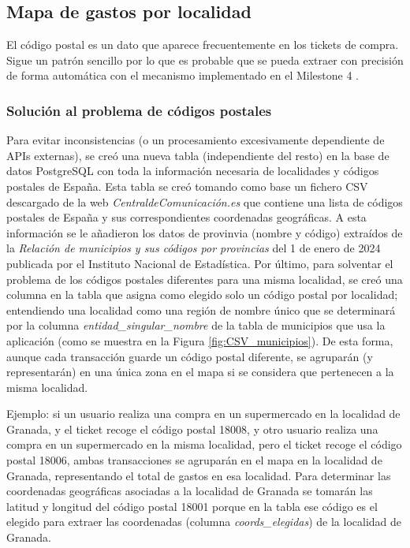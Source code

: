 \subsection{Mapa de gastos por localidad}
El código postal es un dato que aparece frecuentemente en los tickets de compra. Sigue un patrón sencillo por lo que es probable que se pueda extraer con precisión de forma automática con el mecanismo implementado en el Milestone 4 \label{codigo_postal}. 



\subsubsection{Solución al problema de códigos postales}
Para evitar inconsistencias (o un procesamiento excesivamente dependiente de APIs externas), se creó una nueva tabla (independiente del resto) en la base de datos PostgreSQL con toda la información necesaria de localidades y códigos postales de España. Esta tabla se creó tomando como base un fichero CSV descargado de la web \textit{CentraldeComunicación.es} que contiene una lista de códigos postales de España y sus correspondientes coordenadas geográficas. A esta información se le añadieron los datos de provinvia (nombre y código) extraídos de la \textit{Relación de municipios y sus códigos por provincias} del 1 de enero de 2024 publicada por el Instituto Nacional de Estadística. Por último, para solventar el problema de los códigos postales diferentes para una misma localidad, se creó una columna en la tabla que asigna como elegido solo un código postal por localidad; entendiendo una localidad como una región de nombre único que se determinará por la columna \textit{entidad\_singular\_nombre} de la tabla de municipios que usa la aplicación (como se muestra en la Figura \ref{fig:CSV_municipios}). De esta forma, aunque cada transacción guarde un código postal diferente, se agruparán (y representarán) en una única zona en el mapa si se considera que pertenecen a la misma localidad.

Ejemplo: si un usuario realiza una compra en un supermercado en la localidad de Granada, y el ticket recoge el código postal 18008, y otro usuario realiza una compra en un supermercado en la misma localidad, pero el ticket recoge el código postal 18006, ambas transacciones se agruparán en el mapa en la localidad de Granada, representando el total de gastos en esa localidad. Para determinar las coordenadas geográficas asociadas a la localidad de Granada se tomarán las latitud y longitud del código postal 18001 porque en la tabla ese código es el elegido para extraer las coordenadas (columna \textit{coords\_elegidas}) de la localidad de Granada.

